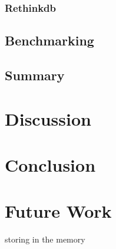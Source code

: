 \documentclass[a4paper,12pt]{article}
\begin{document}
			\subsubsection{Rethinkdb}
		\subsection{Benchmarking}
		\subsection{Summary}
	\newpage
	\section{Discussion}
	\section{Conclusion}
	\label{conc}
	
	\newpage
	\section{Future Work}
	\label{s.future}
	storing in the memory
	\newpage
	
	
	\newpage
	\listoffigures
	\newpage
	\listoftables
	\newpage
	\lstlistoflistings
	
\end{document}
